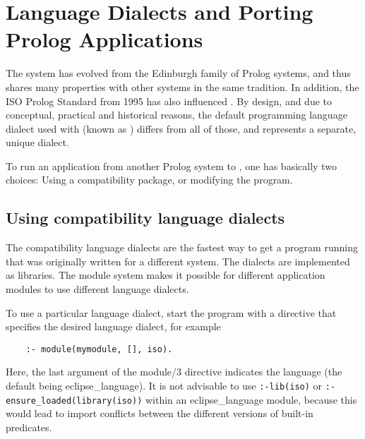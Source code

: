 %
%
%
%
%
%
%

\chapter{Language Dialects and Porting Prolog Applications}
\label{chapporting}

The {\eclipse} system has evolved from the Edinburgh family of
Prolog systems, and thus shares many properties with other systems
in the same tradition.  In addition, the ISO Prolog Standard from 1995
has also influenced {\eclipse}.
By design, and due to conceptual, practical and historical
reasons, the default programming language dialect used with {\eclipse}
(known as ) differs from all of those,
and represents a separate, unique dialect.

To run an application from another Prolog system to {\eclipse},
one has basically two choices:
Using a compatibility package, or modifying the program.


\section{Using compatibility language dialects}
The {\eclipse} compatibility language dialects are the fastest way to get a
program running that was originally written for a different system.
The dialects are implemented as libraries.
The module system makes it possible for different application
modules to use different language dialects.

To use a particular language dialect, start the program with a
directive that specifies the desired language dialect, for example
\begin{verbatim}
    :- module(mymodule, [], iso).
\end{verbatim}
Here, the last argument of the module/3 directive indicates the language
(the default being eclipse_language).
It is not advisable to use \verb.:-lib(iso). or \verb.:-ensure_loaded(library(iso)).
within an eclipse_language module, because this would lead to import
conflicts between the different versions of built-in predicates.

